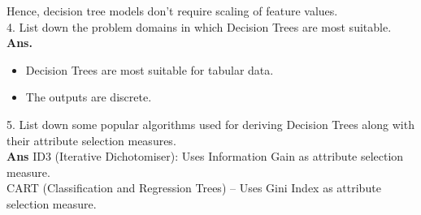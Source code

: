 \documentclass[a4paper, 11pt]{article}
\begin{document}
Hence, decision tree models don't require scaling of feature values.\\
4. List down the problem domains in which Decision Trees are most suitable. \\
\textbf{Ans.}  
\begin{itemize}
    \item Decision Trees are most suitable for tabular data.
    \item  The outputs are discrete.
\end{itemize}          
5. List down some popular algorithms used for deriving Decision Trees along with their attribute selection measures.\\
\textbf{Ans} ID3 (Iterative Dichotomiser): Uses Information Gain as attribute selection measure. \\
CART (Classification and Regression Trees) – Uses Gini Index as attribute selection measure.

\end{document}
